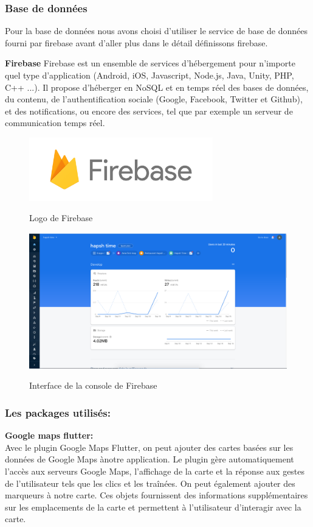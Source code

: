 \subsubsection{Base de données}
Pour la base de données nous avons choisi d'utiliser le service de base de données fourni par
firebase avant d'aller plus dans le détail définissons firebase.

\textbf{Firebase}
Firebase est un ensemble de services d'hébergement pour n'importe quel type 
d'application (Android, iOS, Javascript, Node.js, Java, Unity, PHP, C++ ...).
Il propose d'héberger en NoSQL et en temps réel des bases de données, du contenu,
de l'authentification sociale (Google, Facebook, Twitter et Github), et des 
notifications, ou encore des services, tel que par exemple un serveur de 
communication temps réel.~\cite{Firebase2020}

\begin{figure}[!h]
    \centering
    \includegraphics[width=8cm]{images/Chapitre3/firebase.png}
    \label{fig:label8}
    \caption{Logo de Firebase}
\end{figure}  
\begin{figure}[!h]

    \centering
    \includegraphics[width=7in]{images/Chapitre3/firebase_console.png}
    \label{fig:firebasepricing}
    \caption{Interface de la console de Firebase }
\end{figure}

\newpage
\subsubsection{Les packages utilisés: }         
\textbf{Google maps flutter:}\\
Avec le plugin Google Maps Flutter, on peut ajouter des cartes basées sur les données de Google Maps ànotre application. Le plugin gère automatiquement l'accès aux serveurs Google Maps, l'affichage de la carte et la réponse aux gestes de l'utilisateur tels que les clics et les traînées. On peut également ajouter des marqueurs à notre carte. Ces objets fournissent des informations supplémentaires sur les emplacements de la carte et permettent à l'utilisateur d'interagir avec la carte.\bigskip

